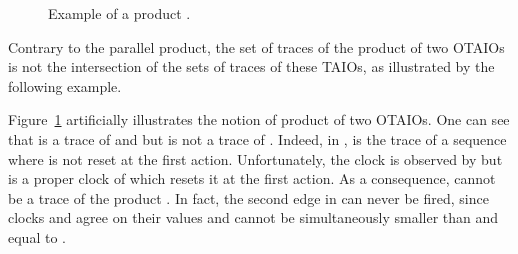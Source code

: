 \documentclass{LMCS}
\theoremstyle{plain}\newtheorem{proposition}[thm]{Proposition}
\begin{document}
\begin{center}
\begin{figure}[hbt]
{\begin{minipage}{0.52\textwidth}
\begin{center}
\end{center}
\end{minipage}
 \begin{minipage}{0.52\textwidth}
 \begin{center}
  \end{center}
 \end{minipage}}

 \caption{Example of a product .}\label{ex_prod}\end{figure}   
 \end{center}

Contrary to the parallel product, 
the set of traces of the product of two OTAIOs 
is not the intersection of the sets of traces of these TAIOs,
as illustrated by the following example. 

\begin{exa}
  Figure~\ref{ex_prod} artificially illustrates the notion of product
  of two OTAIOs.  One can see that  is a trace of
   and  but is not a trace of .  Indeed, in
  ,  is the trace of a sequence where 
  is not reset at the first action. Unfortunately, the clock  is
  observed by  but is a proper clock of
   which resets it at the first action. As a
  consequence,  cannot be a trace of the product
  . In fact, the second edge
    in  can never be fired, since clocks  and  agree on their values and cannot be
  simultaneously smaller than  and equal to .
\end{exa}
\end{document}
